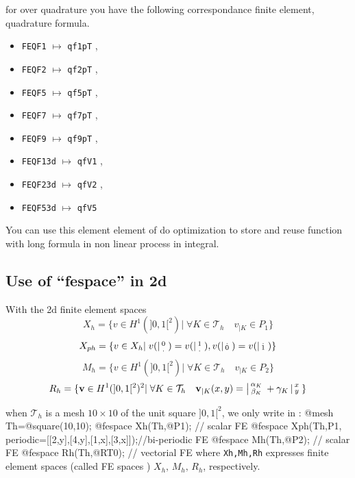 \documentclass[a4paper,twoside,12pt]{book}
\begin{document}
\begin{description}
   for over quadrature you have the following correspondance  finite element, quadrature formula. 
    \begin{itemize}
      \item \texttt{FEQF1} $\mapsto$ \texttt{qf1pT}  , 
      \item \texttt{FEQF2} $\mapsto$ \texttt{qf2pT}  , 
      \item \texttt{FEQF5} $\mapsto$ \texttt{qf5pT}  , 
      \item \texttt{FEQF7} $\mapsto$ \texttt{qf7pT}  , 
      \item \texttt{FEQF9} $\mapsto$ \texttt{qf9pT}  , 
      \item \texttt{FEQF13d} $\mapsto$ \texttt{qfV1}  , 
      \item \texttt{FEQF23d} $\mapsto$ \texttt{qfV2}  , 
      \item \texttt{FEQF53d} $\mapsto$ \texttt{qfV5}   
    \end{itemize}
   You can use this element element of do optimization to store and reuse  function with long formula in non linear process in integral. 
    
     \end{description}
\subsection{Use of ``fespace'' in 2d}
With the 2d finite element spaces
$$  X_{h} = \{ v \in H^{1}(]0,1[^2) |\; \forall K \in \mathcal{T}_{h}
\quad v_{|K} \in
P_{1} \}$$
$$ X_{ph} = \{  v \in X_{h} |\; v(\left|\begin{smallmatrix} 0 \\ . \end{smallmatrix}\right. ) =  v(\left|\begin{smallmatrix} 1 \\ . \end{smallmatrix}\right.) , v(\left|\begin{smallmatrix} . \\ 0 \end{smallmatrix}\right. ) =  v(\left|\begin{smallmatrix} . \\ 1 \end{smallmatrix}\right. )  \}$$
$$  M_{h} = \{ v \in H^{1}(]0,1[^2) |\; \forall K \in \mathcal{T}_{h}
\quad v_{|K} \in
P_{2} \}$$
$$  R_{h} = \{ \mathbf{v} \in H^{1}(]0,1[^2)^{2} |\; \forall K \in \mathcal{T}_{h}
\quad
 \mathbf{v}_{|K}(x,y) =
         \left|\begin{smallmatrix} \alpha_{K} \\ \beta_{K} \end{smallmatrix}\right. + \gamma_{K}\left|\begin{smallmatrix} x \\ y \end{smallmatrix}\right. \}$$

when $\mathcal{T}_h$ is a mesh $10\times 10$ of the unit square $]0,1[^2$,
we only write in \freefempp :
\bFF
@mesh Th=@square(10,10);
@fespace Xh(Th,@P1);      //  scalar FE
@fespace Xph(Th,P1,
         periodic=[[2,y],[4,y],[1,x],[3,x]]);//bi-periodic FE
@fespace Mh(Th,@P2);      //  scalar FE
@fespace Rh(Th,@RT0);     //  vectorial FE
\eFF
where \texttt{Xh,Mh,Rh} expresses finite element spaces (called FE spaces
) $X_h,\, M_h,\, R_h$, respectively.
\end{document}
